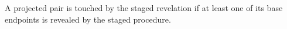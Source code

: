 \begin{definition}
A projected pair is touched by the staged revelation if at least one of its
base endpoints is revealed by the staged procedure.
\end{definition}
